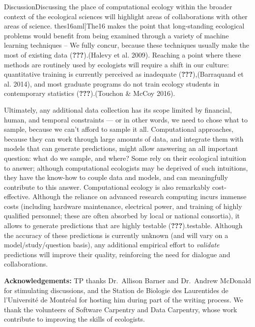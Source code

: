 \documentclass[11pt,serif]{article}
\begin{document}
\color{gray}Discussion\color{black}\color{purple}Discussing\color{black}
the place of computational ecology within the broader context of the
ecological sciences will highlight areas of collaborations with other
areas of science.
\color{gray}{[}thes16aml{]}\color{black}\color{purple}The16\color{black}
makes the point that long-standing ecological problems would benefit
from being examined through a variety of machine learning techniques --
We fully concur, because these techniques usually make the most of
existing data
\color{gray}({\textbf{???}}).\color{black}\color{purple}(Halevy et al.
2009).\color{black} Reaching a point where these methods are routinely
used by ecologists will require a shift in our culture: quantitative
training is currently perceived as inadequate
\color{gray}({\textbf{???}}),\color{black}\color{purple}(Barraquand et
al. 2014),\color{black} and most graduate programs do not train ecology
students in contemporary statistics
\color{gray}({\textbf{???}}).\color{black}\color{purple}(Touchon \&
McCoy 2016).\color{black}

Ultimately, any additional data collection has its scope limited by
financial, human, and temporal constraints --- or in other words, we
need to chose what to sample, because we can't afford to sample it all.
Computational approaches, because they can work through large amounts of
data, and integrate them with models that can generate predictions,
might allow answering an all important question: what do we sample, and
where? Some rely on their ecological intuition to answer; although
computational ecologists may be deprived of such intuitions, they have
the know-how to couple data and models, and can meaningfully contribute
to this answer. Computational ecology is also remarkably cost-effective.
Although the reliance on advanced research computing incurs immense
costs (including hardware maintenance, electrical power, and training of
highly qualified personnel; these are often absorbed by local or
national consortia), it allows to generate predictions that are highly
\color{gray}testable\color{black}
\color{gray}({\textbf{???}}).\color{black}\color{purple}testable.\color{black}
Although the accuracy of these predictions is currently unknown (and
will vary on a model/study/question basis), any additional empirical
effort to \emph{validate} predictions will improve their quality,
reinforcing the need for dialogue and collaborations.

\textbf{Acknowledgements:} TP thanks Dr.~Allison Barner and Dr.~Andrew
McDonald for stimulating discussions, and the Station de Biologie des
Laurentides de l'Université de Montréal for hosting him during part of
the writing process. We thank the volunteers of Software Carpentry and
Data Carpentry, whose work contribute to improving the skills of
ecologists.
\end{document}

